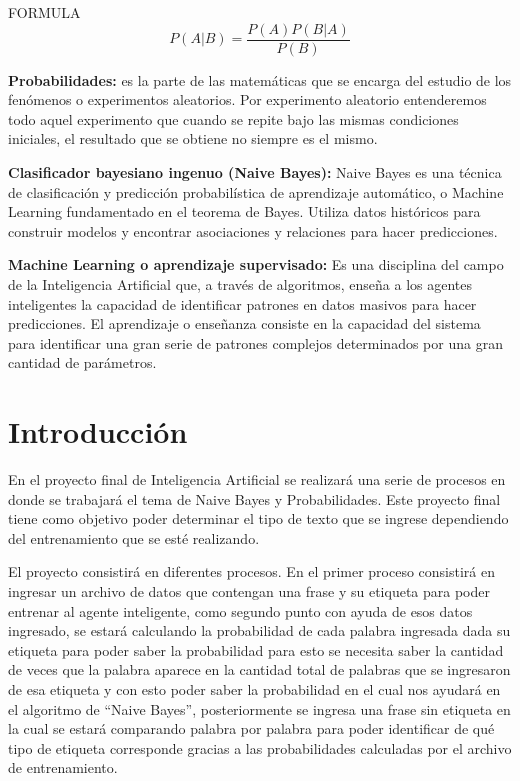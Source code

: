 \documentclass[sigconf]{acmart}
\begin{document}
FORMULA
\begin{equation}
\label{eq:bayes1}
P(A|B) = \frac{P(A)P(B|A)}{P(B)}
\end{equation}

\textbf{Probabilidades:} es la parte de las matemáticas que se encarga del estudio de los fenómenos o experimentos aleatorios. Por experimento aleatorio entenderemos todo aquel experimento que cuando se repite bajo las mismas condiciones iniciales, el resultado que se obtiene no siempre es el mismo. 

\textbf{Clasificador bayesiano ingenuo (Naive Bayes):} Naive Bayes es una técnica de clasificación y predicción probabilística de aprendizaje automático, o Machine Learning fundamentado en el teorema de Bayes. Utiliza datos históricos para construir modelos y encontrar asociaciones y relaciones para hacer predicciones.

\textbf{Machine Learning o aprendizaje supervisado:} Es una disciplina del campo de la Inteligencia Artificial que, a través de algoritmos, enseña a los agentes inteligentes la capacidad de identificar patrones en datos masivos para hacer predicciones. El aprendizaje o enseñanza consiste en la capacidad del sistema para identificar una gran serie de patrones complejos determinados por una gran cantidad de parámetros.\citep{Roman}



\section{Introducción}
En el proyecto final de Inteligencia Artificial se realizará una serie de procesos en donde se trabajará el tema de Naive Bayes y Probabilidades. Este proyecto final tiene como objetivo poder determinar el tipo de texto que se ingrese dependiendo del entrenamiento que se esté realizando.

El proyecto consistirá en diferentes procesos. En el primer proceso consistirá en ingresar un archivo de datos que contengan una frase y su etiqueta para poder entrenar al agente inteligente, como segundo punto con ayuda de esos datos ingresado, se estará calculando la probabilidad de cada palabra ingresada dada su etiqueta para poder saber la probabilidad para esto se necesita saber la cantidad de veces que la palabra aparece en la cantidad total de palabras que se ingresaron de esa etiqueta y con esto poder saber la probabilidad en el cual nos ayudará en el algoritmo de “Naive Bayes”, posteriormente se ingresa una frase sin etiqueta en la cual se estará comparando palabra por palabra para poder identificar de qué tipo de etiqueta corresponde gracias a las probabilidades calculadas por el archivo de entrenamiento.
\end{document}
